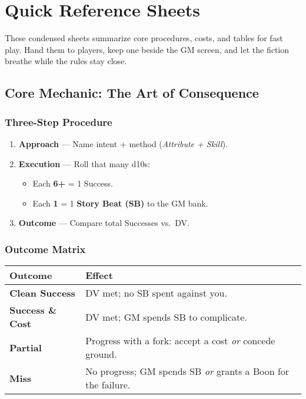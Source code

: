 
\chapter{Quick Reference Sheets}
\label{app:quickref}

\begin{multicols}{2}

These condensed sheets summarize core procedures, costs, and tables for fast play. Hand them to players, keep one beside the GM screen, and let the fiction breathe while the rules stay close.

\section{Core Mechanic: The Art of Consequence}

\subsection*{Three-Step Procedure}
\begin{enumerate}
  \item \textbf{Approach} — Name intent + method (\emph{Attribute + Skill}).
  \item \textbf{Execution} — Roll that many d10s:
  \begin{itemize}
    \item Each \textbf{6+} = 1 Success.
    \item Each \textbf{1} = 1 \textbf{Story Beat (SB)} to the GM bank.
  \end{itemize}
  \item \textbf{Outcome} — Compare total Successes vs.\ DV.
\end{enumerate}

\subsection*{Outcome Matrix}
\begin{center}
\begin{tabular}{lp{7.8cm}}
\toprule
\textbf{Outcome} & \textbf{Effect} \\
\midrule
\textbf{Clean Success} & DV met; no SB spent against you. \\
\textbf{Success \& Cost} & DV met; GM spends SB to complicate. \\
\textbf{Partial} & Progress with a fork: accept a cost \emph{or} concede ground. \\
\textbf{Miss} & No progress; GM spends SB \emph{or} grants a Boon for the failure. \\
\bottomrule
\end{tabular}
\end{center}


\end{multicols}
